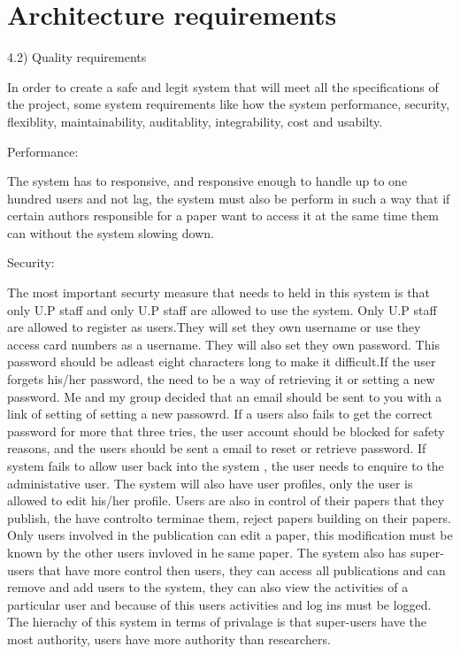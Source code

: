 \documentclass[a4paper,12pt]{report}
\begin{document}
\newpage

\section{Architecture requirements}

4.2) Quality requirements


In order to create a safe and legit system that will meet all the specifications of the project, some system requirements like how the system performance, security, flexiblity, maintainability, auditablity, integrability, cost and usabilty.

Performance: 

The system has to responsive, and responsive enough to handle up to one hundred users and not lag, the system must also be perform in such a way that if certain authors responsible for a paper want to access it at the same time them can without the system slowing down.

Security: 

The most important securty measure that needs to held in this system is that only U.P staff  and only U.P staff are allowed to use the system. Only U.P staff are allowed to register as users.They will set they own username or use they access card numbers as a username. They will also set they own password. This password should be adleast eight characters long to make it difficult.If the user forgets his/her password, the need to be a way of retrieving it or setting a new password. Me and my group decided that an email should be sent to you with a link of setting of setting a new passowrd. If a users also fails to get the correct password for more that three tries, the user account should be blocked for safety reasons, and the users should be sent a email to reset or retrieve password. If system fails to allow user back into the system , the user needs to enquire to the administative user. The system will also have user profiles, only the user is allowed to edit his/her profile. Users are also in control of their papers that they publish, the have controlto terminae them, reject papers building on their papers. Only users involved in the publication can edit a paper, this modification must be known by the other users invloved in he same paper. The system also has super-users that have more control then users, they can access all publications and can remove and add users to the system, they can also view the activities of a particular user and because of this users activities and log ins must be logged. The hierachy of this system in terms of privalage is that super-users have the most authority, users have more authority than researchers.
\end{document}
